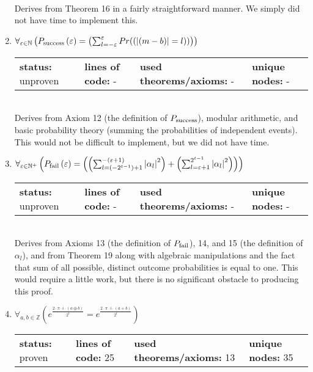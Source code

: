 \documentclass{article}[12pt]
\begin{document}
\begin{enumerate}
\begin{tabular}{l | l | l | l}
  \end{tabular} \hfill \\
Derives from Theorem 16 in a fairly straightforward manner.  We simply did not have time to implement this.
\item $\forall_{\varepsilon \in \mathbb{N}} \left(P_{\rm success}\left(\varepsilon\right) = \left(\sum_{l=-\varepsilon}^{\varepsilon} Pr(\left(\left|\left(m - b\right)\right| = l\right))\right)\right)$ \hfill \\
  \begin{tabular}{l | l | l | l}
    \textbf{status:} unproven & \textbf{lines of code:} - & \textbf{used theorems/axioms:} - & \textbf{unique nodes:} -
  \end{tabular} \hfill \\
Derives from Axiom 12 (the definition of $P_{\rm success}$), modular arithmetic, and basic probability theory (summing the probabilities of independent events).  This would not be difficult to implement, but we did not have time.
\item $\forall_{\varepsilon \in \mathbb{N}^+} \left(P_{\rm fail}\left(\varepsilon\right) = \left(\left(\sum_{l=\left(-2^{t - 1}\right) + 1}^{-\left(\varepsilon + 1\right)} \left|\alpha_{l}\right|^{2}\right) + \left(\sum_{l=\varepsilon + 1}^{2^{t - 1}} \left|\alpha_{l}\right|^{2}\right)\right)\right)$ \hfill \\
  \begin{tabular}{l | l | l | l}
    \textbf{status:} unproven & \textbf{lines of code:} - & \textbf{used theorems/axioms:} - & \textbf{unique nodes:} -    
  \end{tabular} \hfill \\
Derives from Axioms 13 (the definition of $P_{\rm fail}$), 14, and 15 (the definition of $\alpha_l$), and from Theorem 19 along with algebraic manipulations and the fact that sum of all possible, distinct outcome probabilities is equal to one.  This would require a little work, but there is no significant obstacle to producing this proof.
\item $\forall_{a, b \in \mathbb{Z}} \left(e^{\frac{2 \cdot \pi \cdot i \cdot \left(a \oplus b\right)}{2^{t}}} = e^{\frac{2 \cdot \pi \cdot i \cdot \left(a + b\right)}{2^{t}}}\right)$ \hfill \\
  \begin{tabular}{l | l | l | l}
    \textbf{status:} proven & \textbf{lines of code:} 25 & \textbf{used theorems/axioms:} 13 & \textbf{unique nodes:} 35
  \end{tabular} \hfill \\

\end{enumerate}
\end{document}
